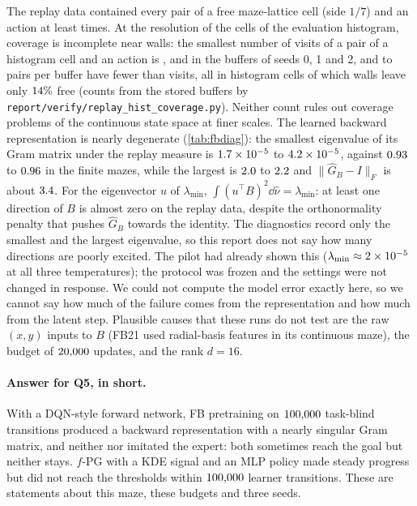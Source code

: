 The replay data contained every pair of a free maze-lattice cell (side $1/7$) and an action at least  times.
At the resolution of the  cells of the evaluation histogram, coverage is incomplete near walls: the smallest number of visits of a pair of a histogram cell and an action is ,  and  in the buffers of seeds 0, 1 and 2, and  to  pairs per buffer have fewer than  visits, all in histogram cells of which walls leave only $\vn{s12.hcov.free_pct}{14}\%$ free (counts from the stored buffers by \nolinkurl{report/verify/replay_hist_coverage.py}).
Neither count rules out coverage problems of the continuous state space at finer scales.
The learned backward representation is nearly degenerate (\cref{tab:fbdiag}): the smallest eigenvalue of its Gram matrix under the replay measure is $\vn{s12.lmin.lo}{1.7\times10^{-5}}$ to $\vn{s12.lmin.hi}{4.2\times10^{-5}}$, against $\vn{s11.lmin.lo}{0.93}$ to $\vn{s11.lmin.hi}{0.96}$ in the finite mazes, while the largest is $\vn{s12.lmax.lo}{2.0}$ to $\vn{s12.lmax.hi}{2.2}$ and $\lVert\hat G_B-I\rVert_F$ is about $\vn{s12.dev}{3.4}$.
For the eigenvector $u$ of $\lambda_{\min}$, $\int(u^\top B)^2\dd\hat\nu=\lambda_{\min}$: at least one direction of $B$ is almost zero on the replay data, despite the orthonormality penalty that pushes $\hat G_B$ towards the identity. The diagnostics record only the smallest and the largest eigenvalue, so this report does not say how many directions are poorly excited.
The pilot had already shown this ($\lambda_{\min}\approx\vn{s10.pilot.lmin}{2\times10^{-5}}$ at all three temperatures); the protocol was frozen and the settings were not changed in response.
We could not compute the model error exactly here, so we cannot say how much of the failure comes from the representation and how much from the latent step.
Plausible causes that these runs do not test are the raw $(x,y)$ inputs to $B$ (FB21 used radial-basis features in its continuous maze), the budget of $\vn{fb.updates.c}{20{,}000}$ updates, and the rank $d=16$.

\paragraph{Answer for Q5, in short.}
With a DQN-style forward network, FB pretraining on $\vn{replay.c}{100{,}000}$ task-blind transitions produced a backward representation with a nearly singular Gram matrix, and neither \ERFB{} nor \DMFB{} imitated the expert: both sometimes reach the goal but neither stays.
$f$-PG with a KDE signal and an MLP policy made steady progress but did not reach the thresholds within $\vn{budget.fpg.c}{100{,}000}$ learner transitions.
These are statements about this maze, these budgets and three seeds.
